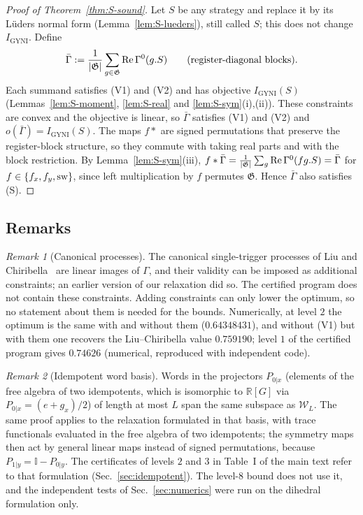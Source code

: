 \documentclass[aps,pra,onecolumn,notitlepage,superscriptaddress,longbibliography,nofootinbib,11pt]{revtex4-2}
\theoremstyle{remark}
\newtheorem{remark}{Remark}
\newcommand{\one}{\mathbb{I}}
\newcommand{\RR}{\mathbb{R}}
\newcommand{\Igy}{I_{\mathrm{GYNI}}}
\newcommand{\cW}{\mathcal{W}}
\newcommand{\GG}{\mathfrak{G}}
\begin{document}
\begin{proof}[Proof of Theorem~\ref{thm:S-sound}]
Let $S$ be any strategy and replace it by its L\"uders normal form (Lemma~\ref{lem:S-lueders}), still called $S$; this does not change $\Igy$. Define
\begin{equation}
\bar\Gamma:=\frac{1}{|\GG|}\sum_{g\in\GG}{\rm Re}\,\Gamma^0(g.S)\qquad\text{(register-diagonal blocks)}.
\end{equation}
Each summand satisfies (V1) and (V2) and has objective $\Igy(S)$ (Lemmas~\ref{lem:S-moment}, \ref{lem:S-real} and \ref{lem:S-sym}(i),(ii)). These constraints are convex and the objective is linear, so $\bar\Gamma$ satisfies (V1) and (V2) and $o(\bar\Gamma)=\Igy(S)$. The maps $f*$ are signed permutations that preserve the register-block structure, so they commute with taking real parts and with the block restriction. By Lemma~\ref{lem:S-sym}(iii), $f*\bar\Gamma=\frac{1}{|\GG|}\sum_g{\rm Re}\,\Gamma^0(fg.S)=\bar\Gamma$ for $f\in\{f_x,f_y,{\rm sw}\}$, since left multiplication by $f$ permutes $\GG$. Hence $\bar\Gamma$ also satisfies (S).
\end{proof}

\subsection{Remarks}

\begin{remark}[Canonical processes]\label{rem:canonical}
The canonical single-trigger processes of Liu and Chiribella~\cite{LiuChiribella2025} are linear images of $\Gamma$, and their validity can be imposed as additional constraints; an earlier version of our relaxation did so. The certified program does not contain these constraints. Adding constraints can only lower the optimum, so no statement about them is needed for the bounds. Numerically, at level $2$ the optimum is the same with and without them ($0.64348431$), and without (V1) but with them one recovers the Liu--Chiribella value $0.759190$; level $1$ of the certified program gives $0.74626$ (numerical, reproduced with independent code).
\end{remark}

\begin{remark}[Idempotent word basis]\label{rem:idempotent}
Words in the projectors $P_{0|x}$ (elements of the free algebra of two idempotents, which is isomorphic to $\RR[G]$ via $P_{0|x}=(e+g_x)/2$) of length at most $L$ span the same subspace as $\cW_L$. The same proof applies to the relaxation formulated in that basis, with trace functionals evaluated in the free algebra of two idempotents; the symmetry maps then act by general linear maps instead of signed permutations, because $P_{1|y}=\one-P_{0|y}$. The certificates of levels $2$ and $3$ in Table~I of the main text refer to that formulation (Sec.~\ref{sec:idempotent}). The level-8 bound does not use it, and the independent tests of Sec.~\ref{sec:numerics} were run on the dihedral formulation only.
\end{remark}
\end{document}
